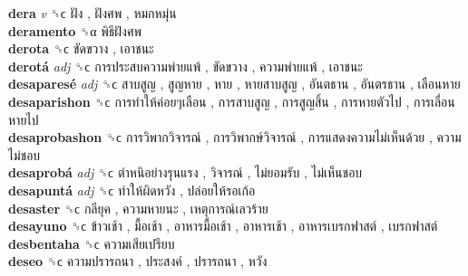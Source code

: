 \textbf{dera} \emph{v}  ␝ϲ   ฝัง ,  ฝังศพ ,  หมกหมุ่น   \\
\textbf{deramento} ␝α   พิธีฝังศพ   \\
\textbf{derota} ␝ϲ   ขัดขวาง ,  เอาชนะ   \\
\textbf{derotá} \emph{adj}  ␝ϲ   การประสบความพ่ายแพ้ ,  ขัดขวาง ,  ความพ่ายแพ้ ,  เอาชนะ   \\
\textbf{desaparesé} \emph{adj}  ␝ϲ   สาบสูญ ,  สูญหาย ,  หาย ,  หายสาบสูญ ,  อันตธาน ,  อันตรธาน ,  เลือนหาย   \\
\textbf{desaparishon} ␝ϲ   การทำให้ค่อยๆเลือน ,  การสาบสูญ ,  การสูญสิ้น ,  การหายตัวไป ,  การเลื่อนหายไป   \\
\textbf{desaprobashon} ␝ϲ   การวิพากวิจารณ์ ,  การวิพากษ์วิจารณ์ ,  การแสดงความไม่เห็นด้วย ,  ความไม่ชอบ   \\
\textbf{desaprobá} \emph{adj}  ␝ϲ   ตำหนิอย่างรุนแรง ,  วิจารณ์ ,  ไม่ยอมรับ ,  ไม่เห็นชอบ   \\
\textbf{desapuntá} \emph{adj}  ␝ϲ   ทำให้ผิดหวัง ,  ปล่อยให้รอเก้อ   \\
\textbf{desaster} ␝ϲ   กลียุค ,  ความหายนะ ,  เหตุการณ์เลวร้าย   \\
\textbf{desayuno} ␝ϲ   ข้าวเช้า ,  มื้อเช้า ,  อาหารมื้อเช้า ,  อาหารเช้า ,  อาหารเบรกฟาสต์ ,  เบรกฟาสต์   \\
\textbf{desbentaha} ␝ϲ   ความเสียเปรียบ   \\
\textbf{deseo} ␝ϲ   ความปรารถนา ,  ประสงค์ ,  ปรารถนา ,  หวัง   \\
